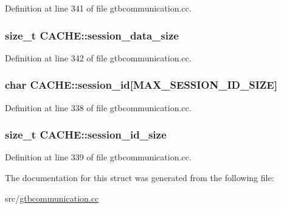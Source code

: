 Definition at line 341 of file gtbcommunication.\-cc.

\hypertarget{structCACHE_ab8dfd4baa14b034eaedad34115ad06f5}{
\subsubsection[{session\-\_\-data\-\_\-size}]{\setlength{\rightskip}{0pt plus 5cm}size\-\_\-t C\-A\-C\-H\-E\-::session\-\_\-data\-\_\-size}}\label{structCACHE_ab8dfd4baa14b034eaedad34115ad06f5}


Definition at line 342 of file gtbcommunication.\-cc.

\hypertarget{structCACHE_a546945d83f3c1401f06d1cfdf5107689}{
\subsubsection[{session\-\_\-id}]{\setlength{\rightskip}{0pt plus 5cm}char C\-A\-C\-H\-E\-::session\-\_\-id\mbox{[}{\bf M\-A\-X\-\_\-\-S\-E\-S\-S\-I\-O\-N\-\_\-\-I\-D\-\_\-\-S\-I\-Z\-E}\mbox{]}}}\label{structCACHE_a546945d83f3c1401f06d1cfdf5107689}


Definition at line 338 of file gtbcommunication.\-cc.

\hypertarget{structCACHE_ad06d74c3164389ccc45261443bafc460}{
\subsubsection[{session\-\_\-id\-\_\-size}]{\setlength{\rightskip}{0pt plus 5cm}size\-\_\-t C\-A\-C\-H\-E\-::session\-\_\-id\-\_\-size}}\label{structCACHE_ad06d74c3164389ccc45261443bafc460}


Definition at line 339 of file gtbcommunication.\-cc.



The documentation for this struct was generated from the following file\-:\begin{DoxyCompactItemize}
\item 
src/\hyperlink{gtbcommunication_8cc}{gtbcommunication.\-cc}\end{DoxyCompactItemize}
